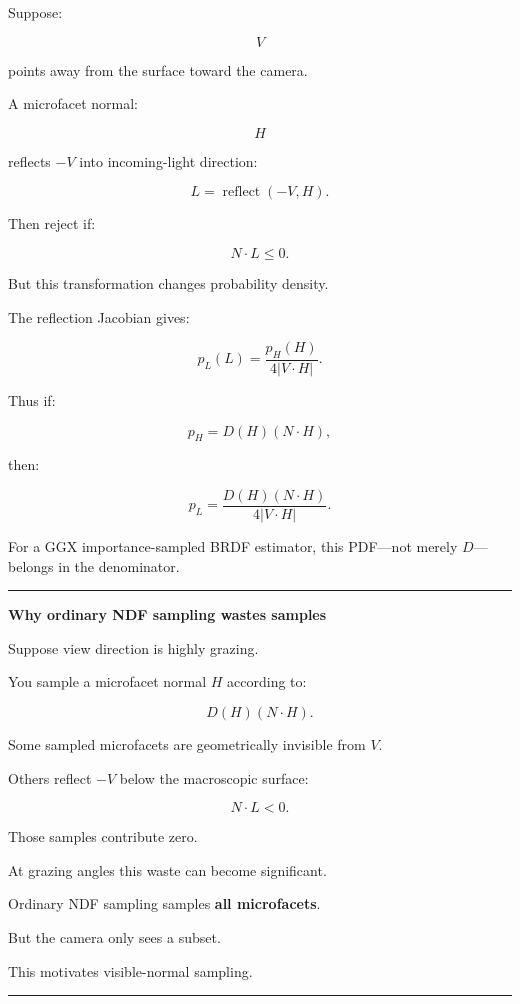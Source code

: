 Suppose:

\[
V
\]

points away from the surface toward the camera.

A microfacet normal:

\[
H
\]

reflects \(-V\) into incoming-light direction:

\[
\boxed{
L=
\operatorname{reflect}(-V,H).
}
\]

Then reject if:

\[
N\cdot L\le0.
\]

But this transformation changes probability density.

The reflection Jacobian gives:

\[
\boxed{
p_L(L)
=
\frac{
p_H(H)
}{
4|V\cdot H|
}.
}
\]

Thus if:

\[
p_H=D(H)(N\cdot H),
\]

then:

\[
\boxed{
p_L
=
\frac{
D(H)(N\cdot H)
}{
4|V\cdot H|
}.
}
\]

For a GGX importance-sampled BRDF estimator, this PDF---not merely \(D\)---belongs in the denominator.

\begin{center}\rule{0.5\linewidth}{0.5pt}\end{center}

\textbf{Why ordinary NDF sampling wastes samples}

Suppose view direction is highly grazing.

You sample a microfacet normal \(H\) according to:

\[
D(H)(N\cdot H).
\]

Some sampled microfacets are geometrically invisible from \(V\).

Others reflect \(-V\) below the macroscopic surface:

\[
N\cdot L<0.
\]

Those samples contribute zero.

At grazing angles this waste can become significant.

Ordinary NDF sampling samples \textbf{all microfacets}.

But the camera only sees a subset.

This motivates visible-normal sampling.

\begin{center}\rule{0.5\linewidth}{0.5pt}\end{center}

